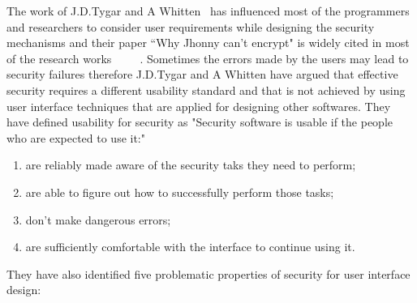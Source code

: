  The work of J.D.Tygar and A Whitten~\cite{whitten1999johnny}  has influenced most of the programmers and researchers to consider user requirements while designing the security mechanisms and their paper ``Why Jhonny can't encrypt" is widely cited in most of the research works~\cite{clark2007usability}~\cite{dingledine2006anonymity}~\cite{furnell2006challenges}~\cite{katsabas2005using}~\cite{brodie2005usable}. Sometimes the errors made by the users may lead to security failures therefore J.D.Tygar and A Whitten have argued that effective security requires a different usability standard and that is not achieved by using user interface techniques that are applied for designing other softwares. They have defined usability for security as "Security software is usable if the people who are expected to use it:"
  \begin{enumerate}
  	\item are reliably made aware of the security taks they need to perform;
  	\item are able to figure out how to successfully perform those tasks;
  	\item don't make dangerous errors;
  	\item are sufficiently comfortable with the interface to continue using it. ~\cite{whitten1999johnny}
  \end{enumerate} 
  They have also identified five problematic properties of security for user interface design:
